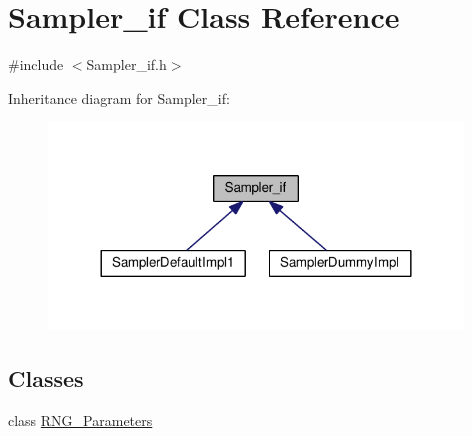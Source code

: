 \hypertarget{class_sampler__if}{}\section{Sampler\+\_\+if Class Reference}
\label{class_sampler__if}


{\ttfamily \#include $<$Sampler\+\_\+if.\+h$>$}



Inheritance diagram for Sampler\+\_\+if\+:\nopagebreak
\begin{figure}[H]
\begin{center}
\leavevmode
\includegraphics[width=312pt]{class_sampler__if__inherit__graph}
\end{center}
\end{figure}
\subsection*{Classes}
\begin{DoxyCompactItemize}
\item 
class \hyperlink{class_sampler__if_1_1_r_n_g___parameters}{R\+N\+G\+\_\+\+Parameters}
\end{DoxyCompactItemize}
